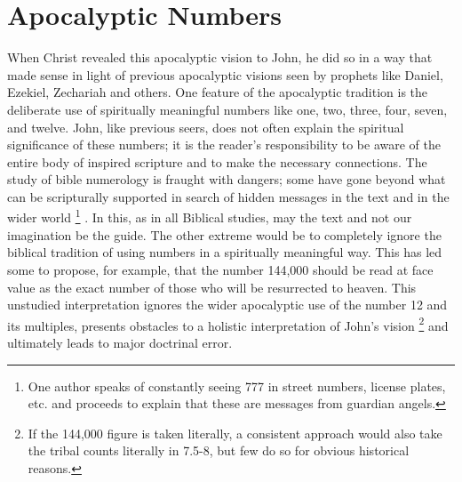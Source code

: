 \backmatter
\markboth{}{} %
\appendix
\appendixpage
\addappheadtotoc
\onecolumn
\setcounter{footnote}{0}
\chapter{Apocalyptic Numbers}
\label{apoc_nums}

When Christ revealed this apocalyptic vision to John, he did so in a way that made sense in light of previous 
apocalyptic visions seen by prophets like Daniel, Ezekiel, Zechariah and others. One feature of the apocalyptic 
tradition is the deliberate use of spiritually meaningful numbers like one, two, three, four, seven, and twelve. 
John, like previous seers, does not often explain the spiritual significance of these numbers; it is the reader's 
responsibility to be aware of the entire body of inspired scripture and to make the necessary connections. 
\newline\newline
The study of bible numerology is fraught with dangers; some have gone beyond what can be scripturally supported in search of hidden messages in the text and in the wider world%
\footnote{One author speaks of constantly seeing 777 in street numbers, license plates, etc. and proceeds to explain that these are messages from guardian angels.}%
. In this, as in all Biblical studies, may the text and not our imagination be the guide. The other extreme would be to completely ignore the biblical tradition of using numbers in a spiritually meaningful way. This has led some to propose, for example, that the number 144,000 should be read at face value as the exact number of those who will be resurrected to heaven. This unstudied interpretation ignores the wider apocalyptic use of the number 12 and its multiples, presents obstacles to a holistic interpretation of John's vision%
\footnote{If the 144,000 figure is taken literally, a consistent approach would also take the tribal counts literally in 7.5-8, but few do so for obvious historical reasons.} %
and ultimately leads to major doctrinal error.
\newline\newline

